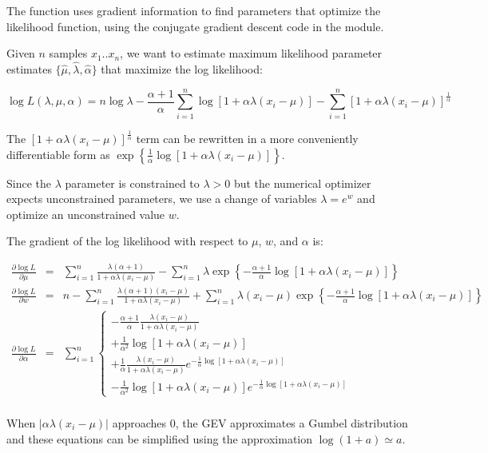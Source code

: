 The function  uses gradient information
to find parameters that optimize the likelihood function, using the
conjugate gradient descent code in the  module.

Given $n$ samples $x_1..x_n$, we want to estimate maximum likelihood
parameter estimates $\{ \hat{\mu}, \hat{\lambda}, \hat{\alpha} \}$
that maximize the log likelihood:

\begin{equation}
\log L(\lambda, \mu, \alpha) = n \log \lambda 
       - \frac{\alpha+1}{\alpha} 
           \sum_{i=1}^{n} \log\left[1+ \alpha\lambda(x_i - \mu) \right]
       - \sum_{i=1}^{n} \left[ 1 + \alpha\lambda (x_i - \mu) \right]^{\frac{1}{\alpha}}
\label{eqn:gev_logL}
\end{equation}

The $\left[ 1 + \alpha\lambda (x_i - \mu) \right]^{\frac{1}{\alpha}}$
term can be rewritten in a more conveniently differentiable form as
$\exp \left\{ \frac{1}{\alpha} \log \left[ 1 + \alpha\lambda (x_i - \mu)
\right] \right\}$.

Since the $\lambda$ parameter is constrained to $\lambda > 0$ but the
numerical optimizer expects unconstrained parameters, we use a change
of variables $\lambda = e^w$ and optimize an unconstrained value $w$.

The gradient of the log likelihood with respect to $\mu$, $w$, and
$\alpha$ is:

\begin{eqnarray}
\frac{\partial \log L}{\partial \mu} & = &
  \sum_{i=1}^n \frac{\lambda (\alpha+1)}{1+\alpha\lambda(x_i-\mu)} 
 -\sum_{i=1}^n \lambda \exp 
    \left\{ -\frac{\alpha+1}{\alpha} \log
          \left[1+\alpha\lambda(x_i-\mu)\right] \right\}
\\%
\label{eqn:gev_mupartial}
\frac{\partial \log L}{\partial w} & = &
  n - \sum_{i=1}^{n} \frac{\lambda (\alpha+1) (x_i - \mu)} 
                          {1 + \alpha \lambda (x_i - \mu)}
  + \sum_{i=1}^n \lambda (x_i - \mu) 
         \exp \left\{ -\frac{\alpha+1}{\alpha} \log
          \left[1+\alpha\lambda(x_i-\mu)\right] \right\}
\\%
\label{eqn:gev_wpartial}
\frac{\partial \log L}{\partial \alpha} & = &
   \sum_{i=1}^n \left\{
      \begin{array}{l}
      - \frac{\alpha+1}{\alpha} \frac{\lambda(x_i-\mu)}
                                  {1 +\alpha\lambda(x_i-\mu)}\\
      + \frac{1}{\alpha^2} \log \left[ 1 + \alpha\lambda(x_i - \mu) \right]\\
      + \frac{1}{\alpha} \frac{\lambda(x_i-\mu)}
                          {1 +\alpha\lambda(x_i-\mu)}
      e^{-\frac{1}{\alpha} \log\left[ 1 + \alpha\lambda(x_i - \mu) \right]}\\
     -  \frac{1}{\alpha^2} \log \left[ 1 + \alpha\lambda(x_i - \mu) \right]
      e^{-\frac{1}{\alpha} \log\left[ 1 + \alpha\lambda(x_i - \mu)
	 \right]} 
     \end{array}
     \right.
\\%
\label{eqn:gev_alphapartial}
\end{eqnarray}

When $|\alpha\lambda(x_i - \mu)|$ approaches $0$, the GEV approximates
a Gumbel distribution and these equations can be simplified using the
approximation $\log(1+a) \simeq a$.







